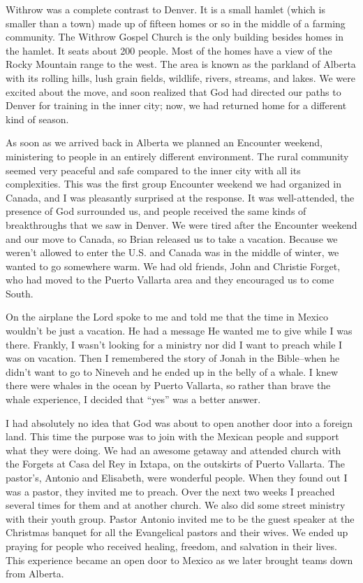 \documentclass[twoside, 12pt]{book}
\begin{document}
Withrow was a complete contrast to Denver. It is a small hamlet (which is smaller than a town) made up of fifteen homes or so in the middle of a farming community. The Withrow Gospel Church is the only building besides homes in the hamlet. It seats about 200 people. Most of the homes have a view of the Rocky Mountain range to the west. The area is known as the parkland of Alberta with its rolling hills, lush grain fields, wildlife, rivers, streams, and lakes. We were excited about the move, and soon realized that God had directed our paths to Denver for  training in the inner city; now, we had returned home for a different kind of season.

As soon as we arrived back in Alberta we planned an Encounter weekend, ministering to people in an entirely different environment. The rural community seemed very peaceful and safe compared to the inner city with all its complexities. This was the first group Encounter weekend we had organized in Canada, and I was pleasantly surprised at the response. It was well-attended, the presence of God surrounded us, and people received the same kinds of breakthroughs that we saw in Denver. 
We were tired after the Encounter weekend and our move to Canada, so Brian released us to take a vacation. Because we weren’t allowed to enter the U.S. and Canada was in the middle of winter, we wanted to go somewhere warm. We had old friends, John and Christie Forget, who had moved to the Puerto Vallarta area and they encouraged us to come South.

On the airplane the Lord spoke to me and told me that the time in Mexico wouldn’t be just a vacation. He had a message He wanted me to give while I was there. Frankly, I wasn’t looking for a ministry nor did I want to preach while I was on vacation. Then I remembered the story of Jonah in the Bible--when he didn’t want to go to Nineveh and he ended up in the belly of a whale. I knew there were whales in the ocean by Puerto Vallarta, so rather than brave the whale experience, I decided that “yes” was a better answer.

I had absolutely no idea that God was about to open another door into a foreign land. This time the purpose was to join with the Mexican people and support what they were doing. We had an awesome getaway and attended church with the Forgets at Casa del Rey in Ixtapa, on the outskirts of Puerto Vallarta. The pastor’s, Antonio and Elisabeth, were wonderful people. When they found out I was a pastor, they invited me to preach. Over the next two weeks I preached several times for them and at another church. We also did some street ministry with their youth group. Pastor Antonio invited me to be the guest speaker at the Christmas banquet for all the Evangelical pastors and their wives. We ended up praying for people who received healing, freedom, and salvation in their lives. This experience became an open door to Mexico as we later brought teams down from Alberta. 
\end{document}
